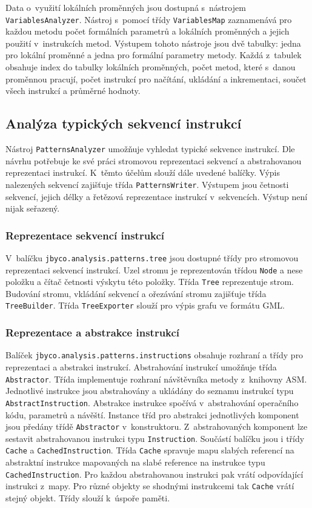 Data o~využití lokálních proměnných jsou dostupná s~nástrojem \texttt{VariablesAnalyzer}. Nástroj s~pomocí třídy \texttt{VariablesMap} zaznamenává pro každou metodu počet formálních parametrů a lokálních proměnných a jejich použití v~instrukcích metod. Výstupem tohoto nástroje jsou dvě tabulky: jedna pro lokální proměnné a jedna pro formální parametry metody. Každá z~tabulek obsahuje index do tabulky lokálních proměnných, počet metod, které s~danou proměnnou pracují, počet instrukcí pro načítání, ukládání a inkrementaci, součet všech instrukcí a průměrné hodnoty.

\subsection{Analýza typických sekvencí instrukcí}

Nástroj \texttt{PatternsAnalyzer} umožňuje vyhledat typické sekvence instrukcí. Dle návrhu potřebuje ke své práci stromovou reprezentaci sekvencí a abstrahovanou reprezentaci instrukcí. K~těmto účelům slouží dále uvedené balíčky. Výpis nalezených sekvencí zajišťuje třída \texttt{PatternsWriter}. Výstupem jsou četnosti sekvencí, jejich délky a řetězová reprezentace instrukcí v~sekvencích. Výstup není nijak seřazený.

\subsubsection{Reprezentace sekvencí instrukcí}

V~balíčku \texttt{jbyco.analysis.patterns.tree} jsou dostupné třídy pro stromovou reprezentaci sekvencí instrukcí. Uzel stromu je reprezentován třídou \texttt{Node} a nese položku a čítač četnosti výskytu této položky. Třída \texttt{Tree} reprezentuje strom. Budování stromu, vkládání sekvencí a ořezávání stromu zajišťuje třída \texttt{TreeBuilder}. Třída \texttt{TreeExporter} slouží pro výpis grafu ve formátu GML.

\subsubsection{Reprezentace a abstrakce instrukcí}

Balíček \texttt{jbyco.analysis.patterns.instructions} obsahuje rozhraní a třídy pro reprezentaci a abstrakci instrukcí. Abstrahování instrukcí umožňuje třída \texttt{Abstractor}. Třída implementuje rozhraní návštěvníka metody z~knihovny ASM. Jednotlivé instrukce jsou abstrahovány a ukládány do seznamu instrukcí typu \texttt{AbstractInstruction}. Abstrakce instrukce spočívá v~abstrahování operačního kódu, parametrů a návěští. Instance tříd pro abstrakci jednotlivých komponent jsou předány třídě \texttt{Abstractor} v~konstruktoru. Z~abstrahovaných komponent lze sestavit abstrahovanou instrukci typu \texttt{Instruction}. Součástí balíčku jsou i třídy \texttt{Cache} a \texttt{CachedInstruction}. Třída \texttt{Cache} spravuje mapu slabých referencí na abstraktní instrukce mapovaných na slabé reference na instrukce typu \texttt{CachedInstruction}. Pro každou abstrahovanou instrukci pak vrátí odpovídající instrukci z~mapy. Pro různé objekty se shodnými instrukcemi tak \texttt{Cache} vrátí stejný objekt. Třídy slouží k~úspoře paměti.

